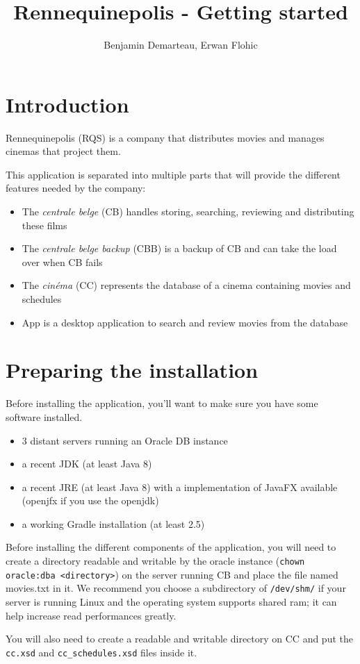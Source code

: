 \documentclass[a4paper]{article}
\title{Rennequinepolis - Getting started}
\author{Benjamin Demarteau, Erwan Flohic}
\begin{document}
\maketitle

\newpage
\renewcommand*\contentsname{Table of contents}

\tableofcontents

\newpage
\section{Introduction}

Rennequinepolis (RQS) is a company that distributes movies and manages cinemas that project them.\par
This application is separated into multiple parts that will provide the different features needed by the company:
\begin{itemize}
	\item The \emph{centrale belge} (CB) handles storing, searching, reviewing and distributing these films
	\item The \emph{centrale belge backup} (CBB) is a backup of CB and can take the load over when CB fails
	\item The \emph{cinéma} (CC) represents the database of a cinema containing movies and schedules
	\item App is a desktop application to search and review movies from the database
\end{itemize}

\section{Preparing the installation}

Before installing the application, you'll want to make sure you have some software installed.
\begin{itemize}
	\item 3 distant servers running an Oracle DB instance
	\item a recent JDK (at least Java 8)
	\item a recent JRE (at least Java 8) with a implementation of JavaFX available (openjfx if you use the openjdk)
	\item a working Gradle installation (at least 2.5)
\end{itemize}

Before installing the different components of the application, you will need to create a directory readable and writable by the oracle instance (\texttt{chown oracle:dba <directory>}) on the server running CB and place the file named movies.txt in it. We recommend you choose a subdirectory of \texttt{/dev/shm/} if your server is running Linux and the operating system supports shared ram; it can help increase read performances greatly.
\par
You will also need to create a readable and writable directory on CC and put the \texttt{cc.xsd} and \texttt{cc\_schedules.xsd} files inside it.
\end{document}
